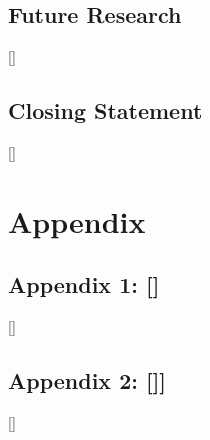 \documentclass{article}
\begin{document}
    \subsection{Future Research}
        []
    \subsection{Closing Statement}
        []

\newpage
\section*{Appendix}
    \subsection*{Appendix 1: []}
        []
    \subsection*{Appendix 2: []]}
        []
\end{document}
